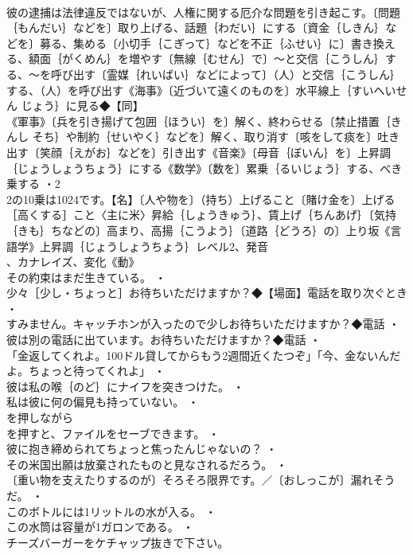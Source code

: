 \documentclass[8pt]{extreport}
\begin{document}
\begin{CJK}{UTF8}{min}
\\	彼の逮捕は法律違反ではないが、人権に関する厄介な問題を引き起こす。〔問題｛もんだい｝などを〕取り上げる、話題｛わだい｝にする〔資金｛しきん｝などを〕募る、集める〔小切手｛こぎって｝などを不正｛ふせい｝に〕書き換える、額面｛がくめん｝を増やす〔無線｛むせん｝で〕～と交信｛こうしん｝する、～を呼び出す〔霊媒｛れいばい｝などによって〕（人）と交信｛こうしん｝する、（人）を呼び出す《海事》〔近づいて遠くのものを〕水平線上｛すいへいせん じょう｝に見る◆【同】
\\	《軍事》〔兵を引き揚げて包囲｛ほうい｝を〕解く、終わらせる〔禁止措置｛きんし そち｝や制約｛せいやく｝などを〕解く、取り消す〔咳をして痰を〕吐き出す〔笑顔｛えがお｝などを〕引き出す《音楽》〔母音｛ぼいん｝を〕上昇調｛じょうしょうちょう｝にする《数学》〔数を〕累乗｛るいじょう｝する、べき乗する ・2 
\\	2の10乗は1024です。【名】〔人や物を〕（持ち）上げること〔賭け金を〕上げる［高くする］こと〈主に米〉昇給｛しょうきゅう｝、賃上げ｛ちんあげ｝〔気持｛きも｝ちなどの〕高まり、高揚｛こうよう｝〔道路｛どうろ｝の〕上り坂《言語学》上昇調｛じょうしょうちょう｝レベル2、発音
\\	、カナレイズ、変化《動》
\\	その約束はまだ生きている。 ・
\\	少々［少し・ちょっと］お待ちいただけますか？◆【場面】電話を取り次ぐとき ・
\\	すみません。キャッチホンが入ったので少しお待ちいただけますか？◆電話 ・
\\	彼は別の電話に出ています。お待ちいただけますか？◆電話 ・
\\	「金返してくれよ。100ドル貸してからもう2週間近くたつぞ」「今、金ないんだよ。ちょっと待ってくれよ」 ・
\\	彼は私の喉｛のど｝にナイフを突きつけた。 ・
\\	私は彼に何の偏見も持っていない。 ・
\\	を押しながら
\\	を押すと、ファイルをセーブできます。 ・
\\	彼に抱き締められてちょっと焦ったんじゃないの？ ・
\\	その米国出願は放棄されたものと見なされるだろう。 ・
\\	〔重い物を支えたりするのが〕そろそろ限界です。／〔おしっこが〕漏れそうだ。 ・
\\	このボトルには1リットルの水が入る。 ・
\\	この水筒は容量が1ガロンである。 ・
\\	チーズバーガーをケチャップ抜きで下さい。

\end{CJK}
\end{document}
